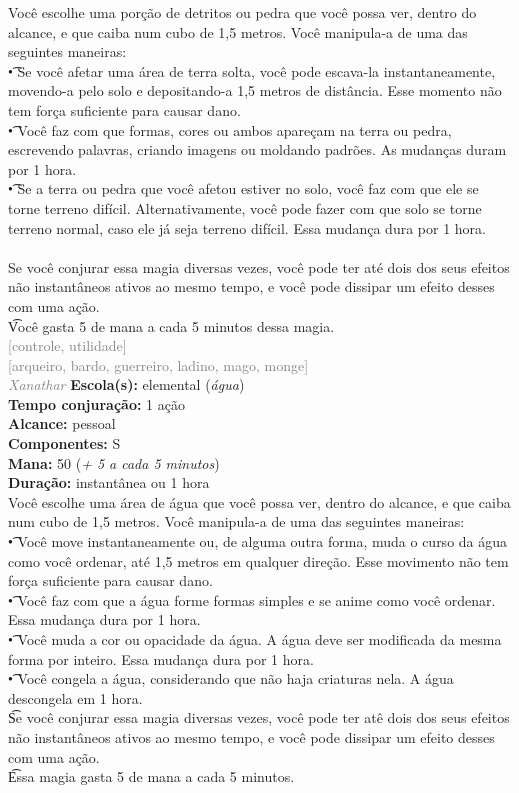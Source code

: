 \documentclass{RPG_Adventure}[2021/10/20]
\begin{document}
{\normalsize Você escolhe uma porção de detritos ou pedra que você possa ver, dentro do alcance, e que caiba num cubo de 1,5 metros. Você manipula-a de uma das seguintes maneiras: \\\t • Se você afetar uma área de terra solta, você pode escava-la instantaneamente, movendo-a pelo solo e depositando-a 1,5 metros de distância. Esse momento não tem força suficiente para causar dano.\\\t • Você faz com que formas, cores ou ambos apareçam na terra ou pedra, escrevendo palavras, criando imagens ou moldando padrões. As mudanças duram por 1 hora.\\\t • Se a terra ou pedra que você afetou estiver no solo, você faz com que ele se torne terreno difícil. Alternativamente, você pode fazer com que solo se torne terreno normal, caso ele já seja terreno difícil. Essa mudança dura por 1 hora.\\\\Se você conjurar essa magia diversas vezes, você pode ter até dois dos seus efeitos não instantâneos ativos ao mesmo tempo, e você pode dissipar um efeito desses com uma ação.\\\t Você gasta 5 de mana a cada 5 minutos dessa magia.\\}
{\scriptsize \textcolor{gray}{[controle, utilidade]\\}}
{\scriptsize \textcolor{gray}{[arqueiro, bardo, guerreiro, ladino, mago, monge]\\}}
{\tiny \textcolor{gray}{\textit{Xanathar}}}
{\small \t \textbf{Escola(s):} elemental (\textit{água})\\\t \textbf{Tempo conjuração:} 1 ação\\\t \textbf{Alcance:} pessoal\\\t \textbf{Componentes:} S\\\t \textbf{Mana:} 50 (\textit{+ 5 a cada 5 minutos})\\\t \textbf{Duração:} instantânea ou 1 hora\\}
{\normalsize Você escolhe uma área de água que você possa ver, dentro do alcance, e que caiba num cubo de 1,5 metros. Você manipula-a de uma das seguintes maneiras:\\\t • Você move instantaneamente ou, de alguma outra forma, muda o curso da água como você ordenar, até 1,5 metros em qualquer direção. Esse movimento não tem força suficiente para causar dano.\\\t • Você faz com que a água forme formas simples e se anime como você ordenar. Essa mudança dura por 1 hora.\\\t • Você muda a cor ou opacidade da água. A água deve ser modificada da mesma forma por inteiro. Essa mudança dura por 1 hora.\\\t • Você congela a água, considerando que não haja criaturas nela. A água descongela em 1 hora.\\\t Se você conjurar essa magia diversas vezes, você pode ter atê dois dos seus efeitos não instantâneos ativos ao mesmo tempo, e você pode dissipar um efeito desses com uma ação.\\\t Essa magia gasta 5 de mana a cada 5 minutos.\\}
\end{document}

